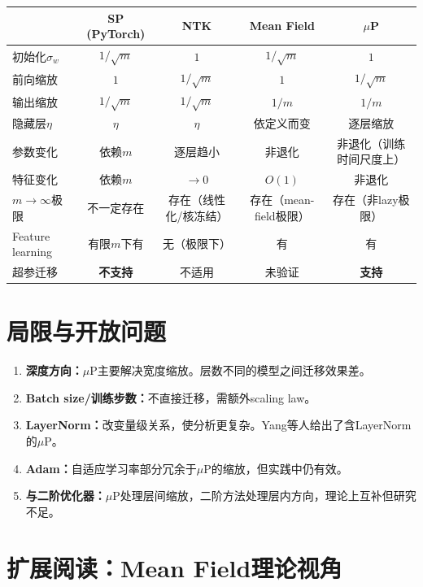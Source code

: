 \documentclass[11pt,a4paper]{article}
\begin{document}
\begin{center}
\small
\renewcommand{\arraystretch}{1.2}
\begin{tabular}{l|cccc}
\toprule
& SP (PyTorch) & NTK & Mean Field & $\mu$P \\
\midrule
初始化$\sigma_w$ & $1/\sqrt{m}$ & $1$ & $1/\sqrt{m}$ & $1$ \\
前向缩放 & $1$ & $1/\sqrt{m}$ & $1$ & $1/\sqrt{m}$ \\
输出缩放 & $1/\sqrt{m}$ & $1/\sqrt{m}$ & $1/m$ & $1/m$ \\
隐藏层$\eta$ & $\eta$ & $\eta$ & 依定义而变 & 逐层缩放 \\
参数变化 & 依赖$m$ & 逐层趋小 & 非退化 & 非退化（训练时间尺度上） \\
特征变化 & 依赖$m$ & $\to 0$ & $O(1)$ & 非退化 \\
$m\to\infty$极限 & 不一定存在 & 存在（线性化/核冻结） & 存在（mean-field极限） & 存在（非lazy极限） \\
Feature learning & 有限$m$下有 & 无（极限下） & 有 & 有 \\
超参迁移 & \textbf{不支持} & 不适用 & 未验证 & \textbf{支持} \\
\bottomrule
\end{tabular}
\end{center}

\section{局限与开放问题}

\begin{enumerate}[leftmargin=*]
\item \textbf{深度方向：}$\mu$P主要解决宽度缩放。层数不同的模型之间迁移效果差。
\item \textbf{Batch size/训练步数：}不直接迁移，需额外scaling law。
\item \textbf{LayerNorm：}改变量级关系，使分析更复杂。Yang等人给出了含LayerNorm的$\mu$P。
\item \textbf{Adam：}自适应学习率部分冗余于$\mu$P的缩放，但实践中仍有效。
\item \textbf{与二阶优化器：}$\mu$P处理层间缩放，二阶方法处理层内方向，理论上互补但研究不足。
\end{enumerate}

\section{扩展阅读：Mean Field理论视角}
\end{document}
